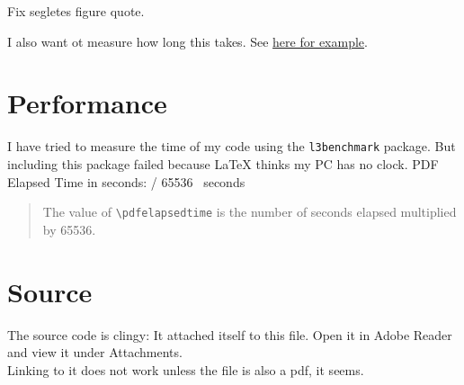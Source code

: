 \documentclass{article} \usepackage[utf8]{inputenc}
\newcommand{\code}[1]{\colorbox{codebggray}{{\texttt{#1}}}}
\begin{document}
Fix segletes figure quote.

I also want ot measure how long this takes. See \href{https://tex.stackexchange.com/questions/505770/how-to-measure-the-compilation-time-of-a-document?rq=1}{here for example}.
\section{Performance}
I have tried to measure the time of my code using the \code{l3benchmark} package. But including this package failed because LaTeX thinks my PC has no clock.
PDF Elapsed Time in seconds: \the\numexpr \pdfelapsedtime / 65536 \relax ~seconds
\begin{myquote}\begin{quote}
The value of \code{\textbackslash pdfelapsedtime} is the number of seconds elapsed multiplied by 65536. 
\end{quote}\end{myquote}

\section{Source}
The source code is clingy: It attached itself to this file. Open it in Adobe Reader and view it under Attachments.\\
Linking to it does not work unless the file is also a pdf, it seems.
\end{document}
